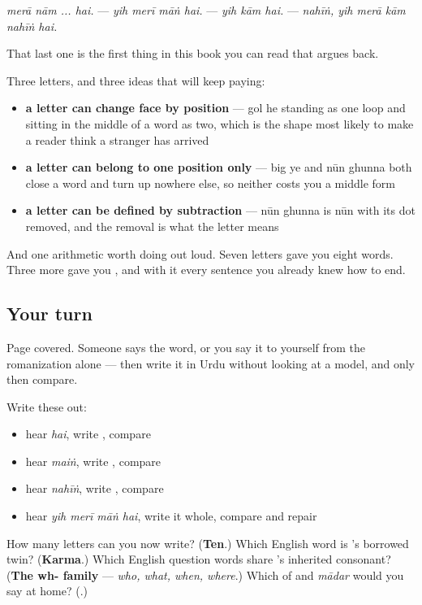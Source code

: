 \begin{quote}
     
\end{quote}

\emph{merā nām ... hai.} — \emph{yih merī māṅ hai.} — \emph{yih kām hai.} — \emph{nahīṅ, yih merā kām nahīṅ hai.}

That last one is the first thing in this book you can read that argues back.

\begin{grammarlens}[title={What you've built this chapter}]
Three letters, and three ideas that will keep paying:

\begin{itemize}
\raggedright
  \item \textbf{a letter can change face by position} — gol he standing as one loop and sitting in the middle of a word as two, which is the shape most likely to make a reader think a stranger has arrived
  \item \textbf{a letter can belong to one position only} — big ye and nūn ghunna both close a word and turn up nowhere else, so neither costs you a middle form
  \item \textbf{a letter can be defined by subtraction} — nūn ghunna is nūn with its dot removed, and the removal is what the letter means
\end{itemize}

And one arithmetic worth doing out loud. Seven letters gave you eight words. Three more gave you \textbf{}, and with it every sentence you already knew how to end.
\end{grammarlens}

\subsection*{Your turn}
Page covered. Someone says the word, or you say it to yourself from the romanization alone — then write it in Urdu without looking at a model, and only then compare.

Write these out:

\begin{itemize}
\raggedright
  \item hear \emph{hai}, write \textbf{}, compare
  \item hear \emph{maiṅ}, write \textbf{}, compare
  \item hear \emph{nahīṅ}, write \textbf{}, compare
  \item hear \emph{yih merī māṅ hai}, write it whole, compare and repair
\end{itemize}

\begin{tcolorbox}[breakable,colback=teal!4,colframe=teal!35!black,title={Before you move on}]
How many letters can you now write? (\textbf{Ten}.) Which English word is \textbf{}'s borrowed twin? (\textbf{Karma}.) Which English question words share \textbf{}'s inherited consonant? (\textbf{The wh- family} — \emph{who, what, when, where}.) Which of \textbf{} and \emph{mādar} would you say at home? (\textbf{}.)
\end{tcolorbox}
